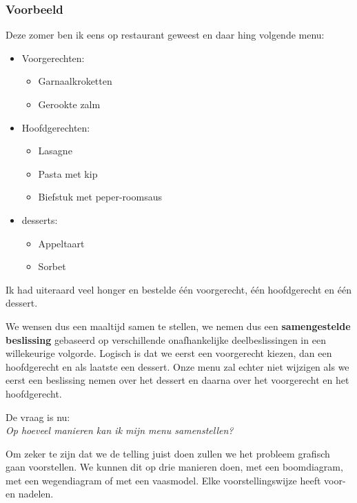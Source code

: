 \documentclass[12pt,twoside]{article}
\begin{document}
\begin{cursus}

\subsubsection*{Voorbeeld}

Deze zomer ben ik eens op restaurant geweest en daar hing volgende menu:

\begin{mdframed}
\begin{itemize}
  \item Voorgerechten:
  \begin{itemize}
    \item Garnaalkroketten
    \item Gerookte zalm
  \end{itemize}
  \item Hoofdgerechten:
  \begin{itemize}
    \item Lasagne
    \item Pasta met kip
    \item Biefstuk met peper-roomsaus
  \end{itemize}
  \item desserts:
  \begin{itemize}
    \item Appeltaart
    \item Sorbet
  \end{itemize}
\end{itemize}
\end{mdframed}

Ik had uiteraard veel honger en bestelde één voorgerecht, één hoofdgerecht en één dessert.

We wensen dus een maaltijd samen te stellen, we nemen dus een {\bf samengestelde beslissing} gebaseerd op verschillende onafhankelijke deelbeslissingen in een willekeurige volgorde. Logisch is dat we eerst een voorgerecht kiezen, dan een hoofdgerecht en als laatste een dessert. Onze menu zal echter niet wijzigen als we eerst een beslissing nemen over het dessert en daarna over het voorgerecht en het hoofdgerecht.

De vraag is nu:\\
{\em Op hoeveel manieren kan ik mijn menu samenstellen?}

Om zeker te zijn dat we de telling juist doen zullen we het probleem grafisch gaan voorstellen. We kunnen dit op drie manieren doen, met een boomdiagram, met een wegendiagram of met een vaasmodel. Elke voorstellingswijze heeft voor- en nadelen.


\end{cursus}
\end{document}
